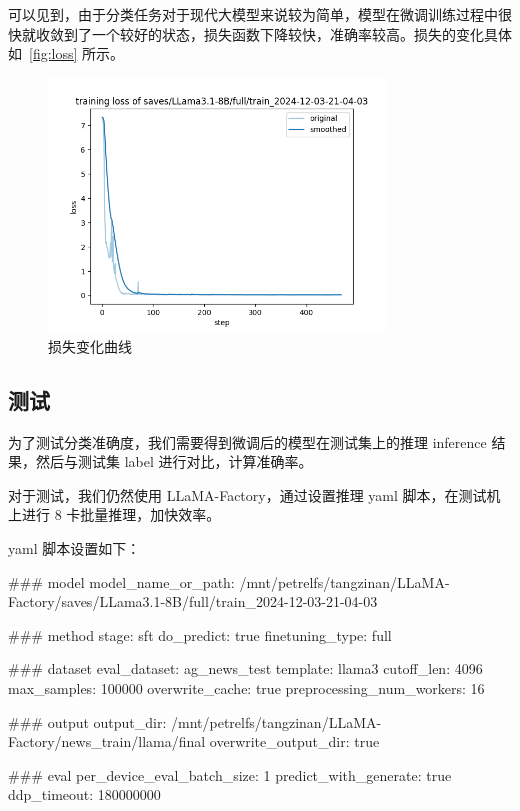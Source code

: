 可以见到，由于分类任务对于现代大模型来说较为简单，模型在微调训练过程中很快就收敛到了一个较好的状态，损失函数下降较快，准确率较高。损失的变化具体如~\autoref{fig:loss} 所示。\begin{figure}[htbp]
    \centering
    \includegraphics[width=0.8\textwidth]{images/loss.png}
    \caption{损失变化曲线}
    \label{fig:loss}
\end{figure}

\subsection{测试}

为了测试分类准确度，我们需要得到微调后的模型在测试集上的推理 inference 结果，然后与测试集 label 进行对比，计算准确率。

对于测试，我们仍然使用 LLaMA-Factory，通过设置推理 yaml 脚本，在测试机上进行 8 卡批量推理，加快效率。

yaml 脚本设置如下：\begin{yamlcode}
    ### model
    model_name_or_path: /mnt/petrelfs/tangzinan/LLaMA-Factory/saves/LLama3.1-8B/full/train_2024-12-03-21-04-03
    
    ### method
    stage: sft
    do_predict: true
    finetuning_type: full
    
    ### dataset
    eval_dataset: ag_news_test
    template: llama3
    cutoff_len: 4096
    max_samples: 100000
    overwrite_cache: true
    preprocessing_num_workers: 16
    
    ### output
    output_dir: /mnt/petrelfs/tangzinan/LLaMA-Factory/news_train/llama/final
    overwrite_output_dir: true
    
    ### eval
    per_device_eval_batch_size: 1
    predict_with_generate: true
    ddp_timeout: 180000000
\end{yamlcode}

